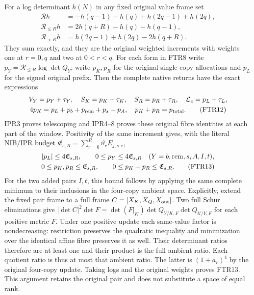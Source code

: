For a log determinant $h(N)$ in any fixed original value frame set
\[
\begin{aligned}
 \mathcal Rh&=-h(q-1)-h(q)+h(2q-1)+h(2q),\\
 \mathcal R_{\le R}h&=2h(q+R)-h(q)-h(q-1),\\
 \mathcal R_{>R}h&=h(2q-1)+h(2q)-2h(q+R).
\end{aligned}                                                   \tag{FTR11}
\]
They sum exactly, and they are the original weighted increments
with weights one at $r=0,q$ and two at $0<r<q$.
For each form in FTR8 write $p_Y=\mathcal R_{\le R}\log\det Q_Y$;
write $p_K,p_R$ for the original single-copy allocations and
$p_L$ for the signed original prefix. Then the complete native
returns have the exact expressions
\[
\begin{gathered}
 V_Y=p_Y+\tau_Y,\quad S_K=p_K+\tau_K,\quad
 S_R=p_R+\tau_R,\quad \mathcal L_e=p_L+\tau_L,\\
 4p_K=p_L+p_b+p_{\rm rem}+p_s+p_A,\quad
 p_K+p_R=p_{\rm total}.                                 \tag{FTR12}
\end{gathered}
\]
IPR3 proves telescoping and IPR4--8 proves these original fibre
identities at each part of the window. Positivity of the same
increment gives, with the literal NIB/IPR budget
$\mathfrak E_{s,R}=\sum_{r=0}^R\vartheta_rE_{j,s,r}$,
\[
\begin{gathered}
 |p_L|\le4\mathfrak E_{s,R},\qquad
 0\le p_Y\le4\mathfrak E_{s,R}\quad
       (Y=b,{\rm rem},s,A,I,t),\\
 0\le p_K,p_R\le\mathfrak E_{s,R},\qquad
 0\le p_K+p_R\le\mathfrak E_{s,R}.                       \tag{FTR13}
\end{gathered}
\]
For the two added pairs $I,t$, this bound follows by applying
the same complete minimum to their inclusions in the four-copy
ambient space. Explicitly, extend the fixed pair frame to a full
frame $C=[X_K,X_Q,X_{\rm out}]$. Two full Schur eliminations give
$|\det C|^2\det F=
\det(F|_K)\det Q_{Y/K,F}\det Q_{\mathcal U/Y,F}$
for each positive metric $F$. Under one positive update each
same-value factor is nondecreasing: restriction preserves the
quadratic inequality and minimization over the identical affine
fibre preserves it as well. Their determinant ratios therefore
are at least one and their product is the full ambient ratio.
Each quotient ratio is thus at most that ambient ratio. The latter
is $(1+a_r)^4$ by the original four-copy update. Taking logs
and the original weights proves FTR13. This argument retains
the original pair and does not substitute a space of equal rank.

